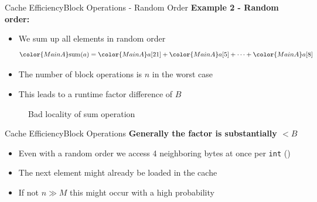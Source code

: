 \begin{frame}{Cache Efficiency}{Block Operations - Random Order}
  \textbf{Example 2 - Random order:}
  \begin{itemize}
    \item<2->
      We sum up all elements in {\color{MainA}random order}
      \begin{displaymath}
        {\color{MainA}\mathrm{sum}(a)} =
        {\color{MainA}a[21]} +
        {\color{MainA}a[5]} +
        \dots +
        {\color{MainA}a[8]}
      \end{displaymath}
    \item<3->
      The number of block operations is {\color{MainA}$n$} in the
      {\color{MainA}worst case}
    \item<4->
      This leads to a runtime factor difference of {\color{MainA}$B$}
  \end{itemize}
   \vspace{-1.0em}
  \begin{figure}%
    \begin{adjustbox}{width=\linewidth}%
    \end{adjustbox}%
    \caption{Bad locality of sum operation}
    \label{fig:caching:memory_locality_random}
  \end{figure}%
  \vspace{-1.0em}
\end{frame}


\begin{frame}{Cache Efficiency}{Block Operations}
  \textbf{Generally the factor is substantially {\color{MainA}$< B$}}
  \begin{itemize}
    \item<2->
      Even with a {\color{MainA}random order} we access 4
      neighboring bytes at once per \texttt{int} ()
    \item<3->
      The next element might already be loaded in the cache
    \item<4->
      If {\color{MainA}not $n \gg M$} this might occur with a high probability 
  \end{itemize}
\end{frame}


